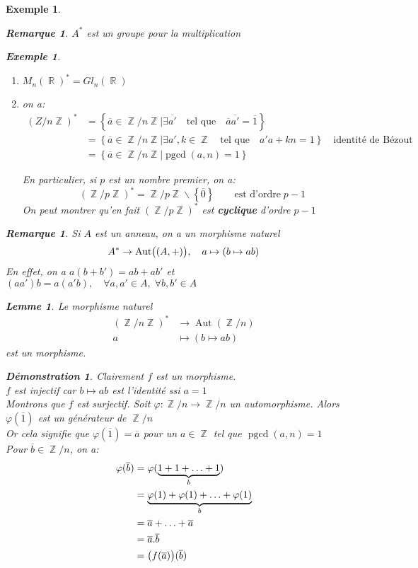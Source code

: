 \documentclass[a4paper, oneside]{report}
\theoremstyle{break}
\newtheorem{lemme}[thm]{Lemme}
\newtheorem{exemple}[thm]{Exemple}
\newtheorem{remarque}[thm]{Remarque}
\newtheorem*{demonstration}{Démonstration}
\DeclareMathOperator{\R}{\mathbb{R}}
\DeclareMathOperator{\Z}{\mathbb{Z}}
\DeclarePairedDelimiter\ens{\left\{ }{\right\} }%
\DeclarePairedDelimiter\pa{\big(}{\big)}%
\DeclareMathOperator{\pgcd}{pgcd}
\DeclareMathOperator{\Aut}{Aut}
\renewcommand{\ens}[1]{\left\{ #1 \right\} }%
\newcommand{\slign}{\textbf}
\newcommand{\ol}{\overline}
\newcommand{\ub}{\underbrace}
\newcommand{\Ens}{\ens}
\begin{document}
\begin{exemple}
\begin{remarque}
$A^*$ est un groupe pour la multiplication
\end{remarque}

\begin{exemple}
\begin{enumerate}
\item  $M_n(\R)^* = Gl_n(\R)$

\medbreak

\item  on a:
\begin{align*}
(Z/n\Z)^* &= \Ens{\ol{a} \in \Z/n\Z \big| \exists \ol{a'}	\quad	\text{tel que}	\quad	\ol{a}\ol{a'} = \ol{1}}
\\
&= \Ens{\ol{a} \in \Z/n\Z \big| \exists a', k \in \Z		\quad	\text{tel que}		\quad	a'a+kn = 1}	\quad	\text{identité de Bézout}
\\
&= \Ens{\ol{a} \in \Z/n\Z \big| \pgcd(a,n) = 1}
\end{align*}

En particulier, si $p$ est un nombre premier, on a:
\[
(\Z/p\Z)^* = \Z/p\Z \backslash \ens{\ol{0}}	\qquad	\text{est d'ordre} \; p - 1
\]
On peut montrer qu'en fait $(\Z/p\Z)^*$ est \slign{cyclique} d'ordre $p - 1$
\end{enumerate}
\end{exemple}

\begin{remarque}
Si $A$ est un anneau, on a un morphisme naturel
\[
A^* \rightarrow \Aut\pa{(A, +)}, 	\quad	a \mapsto (b \mapsto ab)
\]
En effet, on a $a(b+b') = ab + ab'$ et $(aa') b = a(a'b),	\quad	\forall a, a' \in A, \; \forall b, b' \in A$
\end{remarque}

\begin{lemme}
Le morphisme naturel
\begin{align*}
(\Z/n\Z)^* &\rightarrow \Aut(\Z/n)
\\
a &\mapsto (b \mapsto ab)
\end{align*}
est un morphisme.
\end{lemme}

\begin{demonstration}
Clairement $f$ est un morphisme.\\
$f$ est injectif car $b \mapsto ab$ est l'identité ssi $a = 1$\\
Montrons que $f$ est surjectif. Soit $\varphi : \Z/n \rightarrow \Z/n$ un automorphisme. Alors $\varphi(\ol{1})$ est un générateur de $\Z/n$\\
Or cela signifie que $\varphi(\ol{1}) = \ol{a}$ pour un $a \in \Z$ tel que $\pgcd(a, n) = 1$\\
Pour $\ol{b} \in \Z/n$, on a:
\begin{align*}
\varphi(\ol{b}) &= \varphi(\ub{1 + 1 + \ldots + 1}_{b}) 
\\
&= \ub{\varphi(1) + \varphi(1) + \ldots + \varphi(1)}_{b} 
\\
&= \ol{a} + \ldots + \ol{a} 
\\
&= \ol{a} . \ol{b}
\\
&= \pa{f(\ol{a})}(\ol{b})
\end{align*}
~
\end{demonstration}


\end{exemple}
\end{document}
